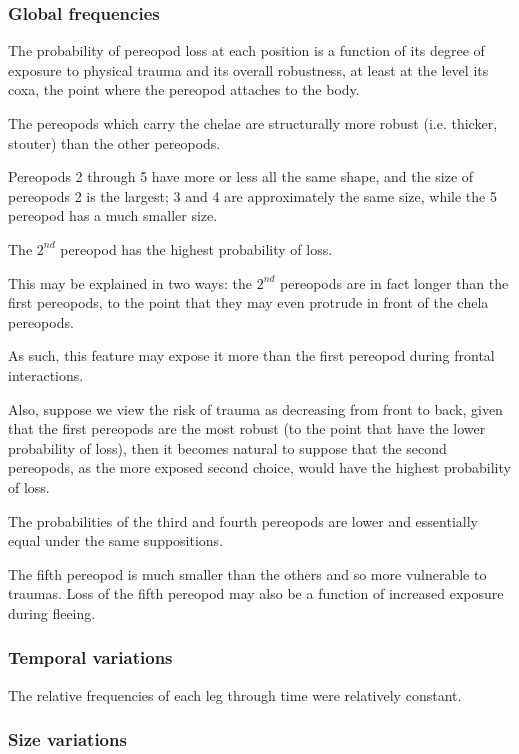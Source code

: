 \documentclass[letterpaper, 10pt]{article}
\begin{document}
\subsubsection{Global frequencies}
The probability of pereopod loss at each position is a function of its degree of exposure to physical trauma and its overall robustness, at least at the level its coxa, the point where the pereopod attaches to the body.

The pereopods which carry the chelae are structurally more robust (i.e. thicker, stouter) than the other pereopods. 

Pereopods 2 through 5 have more or less all the same shape, and the size of pereopods 2 is the largest; 3 and 4 are approximately the same size, while the 5 pereopod has a much smaller size.

The $2^{nd}$ pereopod has the highest probability of loss. 

This may be explained in two ways: the $2^{nd}$ pereopods are in fact longer than the first pereopods, to the point that they may even protrude in front of the chela pereopods. 

As such, this feature may expose it more than the first pereopod during frontal interactions. 

Also, suppose we view the risk of trauma as decreasing from front to back, given that the first pereopods are the most robust (to the point that have the lower probability of loss), then it becomes natural to suppose that the second pereopods, as the more exposed second choice, would have the highest probability of loss. 

The probabilities of the third and fourth pereopods are lower and essentially equal under the same suppositions.

The fifth pereopod is much smaller than the others and so more vulnerable to traumas. Loss of the fifth pereopod may also be a function of increased exposure during fleeing.

\subsubsection{Temporal variations}

The relative frequencies of each leg through time were relatively constant.

\subsubsection{Size variations}
\end{document}
